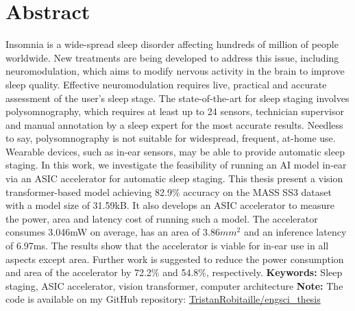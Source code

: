 \documentclass[12pt]{article}
\begin{document}



\maketitle



\onehalfspacing


\newpage

\section*{Abstract}
Insomnia is a wide-spread sleep disorder affecting hundreds of million of people worldwide. New treatments are being developed to address this issue, including neuromodulation,
which aims to modify nervous activity in the brain to improve sleep quality. Effective neuromodulation requires live, practical and accurate assessment of the user's sleep stage.
The state-of-the-art for sleep staging involves polysomnography, which requires at least up to 24 sensors, technician supervisor and manual annotation by a sleep expert for the
most accurate results. Needless to say, polysomnography is not suitable for widespread, frequent, at-home use. Wearable devices, such as in-ear sensors, may be able to provide
automatic sleep staging. In this work, we investigate the feasibility of running an AI model in-ear via an ASIC accelerator for automatic sleep staging. This thesis present a vision
transformer-based model achieving 82.9\% accuracy on the MASS SS3 dataset with a model size of 31.59kB. It also develops an ASIC accelerator to measure the power, area and latency
cost of running such a model. The accelerator consumes 3.046mW on average, has an area of 3.86$mm^2$ and an inference latency of 6.97ms. The results show that the accelerator is 
viable for in-ear use in all aspects except area. Further work is suggested to reduce the power consumption and area of the accelerator by 72.2\% and 54.8\%, respectively.
\newline
\newline
{\bf Keywords:} Sleep staging, ASIC accelerator, vision transformer, computer architecture
\newline
\newline
{\bf Note:} The code is available on my GitHub repository: \href{https://github.com/TristanRobitaille/engsci-thesis}{TristanRobitaille/engsci\_thesis}
\newpage
\end{document}
